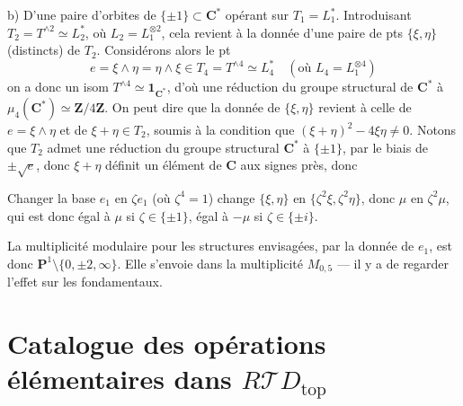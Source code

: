 \documentclass[11pt,a4paper]{article}
\begin{document}
b) D'une paire d'orbites de $\lbrace \pm 1 \rbrace \subset
\mathbf{C}^{*}$ opérant sur $T_1 = L_1^{*}$. Introduisant $T_2 =
T^{\wedge 2} \simeq L_2^{*}$, où $L_2 = L_1^{\otimes 2}$, cela revient à
la donnée d'une paire de pts $\lbrace \xi, \eta \rbrace$ (distincts) de
$T_2$. Considérons alors le pt
\[
e = \xi \wedge \eta = \eta \wedge \xi \in T_4 = T^{\wedge 4} \simeq
L_4^{*} \quad (\text{où } L_4 = L_1^{\otimes 4})
\]
on a donc un isom $T^{\wedge 4} \simeq \mathbf{1}_{\mathbf{C}^{*}}$,
d'où une réduction du groupe structural  de
$\mathbf{C}^{*}$ à $\mu_4(\mathbf{C}^{*}) \simeq \mathbf{Z}/4\mathbf{Z}$.
On peut dire que la donnée de $\lbrace \xi, \eta \rbrace$ revient à celle
de $e = \xi \wedge \eta$  et de $\xi + \eta \in T_2$,
soumis à la condition que $(\xi + \eta)^{2} - 4\xi\eta \neq 0$.
\struck{\ill{}} Notons  que
$T_2$ admet une réduction du groupe structural $\mathbf{C}^{*}$ à
$\lbrace \pm 1 \rbrace$, par le biais de $\pm\sqrt{e}$, donc $\xi + \eta$
définit un élément de $\mathbf{C}$ aux signes près, donc 


Changer la base $e_1$ en $\zeta e_1$ (où $\zeta^{4} = 1$)  \struck{\ill{}} change $\lbrace \xi, \eta \rbrace$ en $\lbrace
\zeta^{2}\xi, \zeta^{2}\eta \rbrace$, donc $\mu$ en $\zeta^{2}\mu$, qui
est donc égal à $\mu$ si $\zeta \in \lbrace \pm 1 \rbrace$, égal à $-\mu$
si $\zeta \in \lbrace \pm i \rbrace$.

La multiplicité modulaire pour les structures envisagées,
 par la donnée de $e_1$, est donc
$\mathbf{P}^{1} \setminus \lbrace 0, \pm 2, \infty \rbrace$. Elle
s'envoie dans la multiplicité $M_{0,5}$ --- il y a  de
regarder l'effet sur les  fondamentaux.

\section{Catalogue des opérations élémentaires dans $R\mathcal{T}D_{\mathrm{top}}$}
\end{document}
